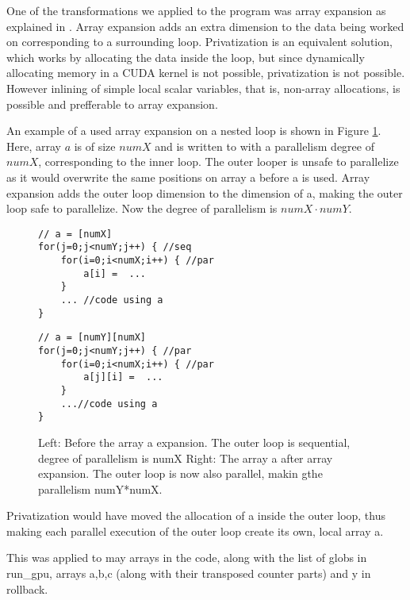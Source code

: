 One of the transformations we applied to the program was array expansion as
explained in \cite[Slide 11]{projectslide}. Array expansion adds an extra dimension to the data being worked on corresponding to a surrounding loop. Privatization is an equivalent solution, which works by allocating the data inside the loop, but since dynamically allocating memory in a CUDA kernel is not possible, privatization is not possible.
However inlining of simple local scalar variables, that is, non-array allocations, is possible and prefferable to array expansion.

An example of a used array expansion on a nested loop is shown in Figure \ref{code:arrayexpansion}. Here, array $a$ is of size $numX$ and is written to with a parallelism degree of $numX$, corresponding to the inner loop. The outer looper is unsafe to parallelize as it would overwrite the same positions on array a before a is used. Array expansion adds the outer loop dimension to the dimension of a, making the outer loop safe to parallelize. Now the degree of parallelism is $numX\cdot numY$.

\begin{figure}[H]
    \begin{minipage}{.45\textwidth}
        \begin{lstlisting}
// a = [numX]
for(j=0;j<numY;j++) { //seq
    for(i=0;i<numX;i++) { //par
        a[i] =  ...
    }
    ... //code using a
}
        \end{lstlisting}
    \end{minipage}\hfill
    \begin{minipage}{.45\textwidth}
        \begin{lstlisting}
// a = [numY][numX]
for(j=0;j<numY;j++) { //par
    for(i=0;i<numX;i++) { //par
        a[j][i] =  ...
    }
    ...//code using a
}
        \end{lstlisting}
    \end{minipage}
    \caption{Left: Before the array a expansion. The outer loop is sequential, degree of parallelism is numX Right: The array a after array expansion. The outer loop is now also parallel, makin gthe parallelism numY*numX.}
    \label{code:arrayexpansion}
\end{figure}

Privatization would have moved the allocation of a inside the outer loop, thus making each parallel execution of the outer loop create its own, local array a.

This was applied to may arrays in the code, along with the list of globs in run_gpu, arrays a,b,c (along with their transposed counter parts) and y in rollback.

